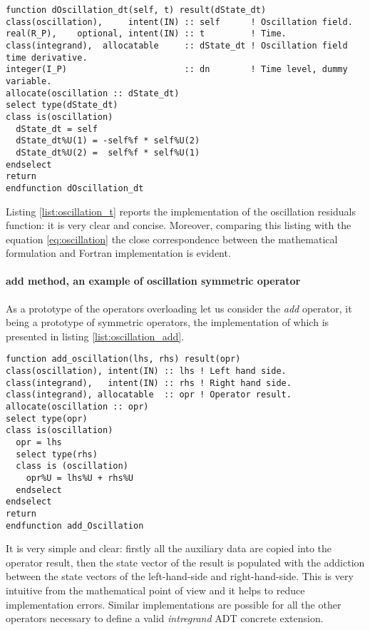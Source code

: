 \begin{lstlisting}[firstnumber=1,style=code,caption={implementation of the \emph{oscillation integrand} residuals function},label={list:oscillation_t}]
function dOscillation_dt(self, t) result(dState_dt)
class(oscillation),     intent(IN) :: self      ! Oscillation field.
real(R_P),    optional, intent(IN) :: t         ! Time.
class(integrand),  allocatable     :: dState_dt ! Oscillation field time derivative.
integer(I_P)                       :: dn        ! Time level, dummy variable.
allocate(oscillation :: dState_dt)
select type(dState_dt)
class is(oscillation)
  dState_dt = self
  dState_dt%U(1) = -self%f * self%U(2)
  dState_dt%U(2) =  self%f * self%U(1)
endselect
return
endfunction dOscillation_dt
\end{lstlisting}

Listing \ref{list:oscillation_t} reports the implementation of the oscillation residuals function: it is very clear and concise. Moreover, comparing this listing with the equation \ref{eq:oscillation} the close correspondence between the mathematical formulation and Fortran implementation is evident.

\paragraph{add method, an example of oscillation symmetric operator}

As a prototype of the operators overloading let us consider the \emph{add} operator, it being a prototype of symmetric operators, the implementation of which is presented in listing \ref{list:oscillation_add}.

\begin{lstlisting}[firstnumber=1,style=code,caption={implementation of the \emph{oscillation integrand} add operator},label={list:oscillation_add}]
function add_oscillation(lhs, rhs) result(opr)
class(oscillation), intent(IN) :: lhs ! Left hand side.
class(integrand),   intent(IN) :: rhs ! Right hand side.
class(integrand), allocatable  :: opr ! Operator result.
allocate(oscillation :: opr)
select type(opr)
class is(oscillation)
  opr = lhs
  select type(rhs)
  class is (oscillation)
    opr%U = lhs%U + rhs%U
  endselect
endselect
return
endfunction add_Oscillation
\end{lstlisting}
It is very simple and clear: firstly all the auxiliary data are copied into the operator result, then the state vector of the result is populated with the addiction between the state vectors of the left-hand-side and right-hand-side. This is very intuitive from the mathematical point of view and it helps to reduce implementation errors. Similar implementations are possible for all the other operators necessary to define a valid \emph{intregrand} ADT concrete extension.

